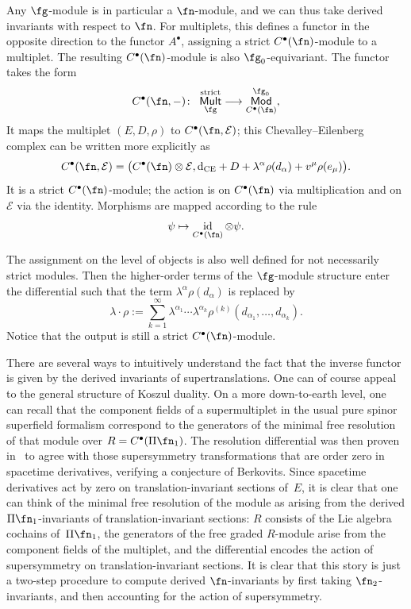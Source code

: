 \documentclass[10pt,a4paper]{amsart}
\numberwithin{equation}{section}
\def\cE{\mathcal E}\def\cF{\mathcal F}\def\cG{\mathcal G}\def\cH{\mathcal H}
\def\cat#1{\ensuremath{\mathsf{#1}}}
\DeclareMathOperator{\Mod}{\cat{Mod}}
\DeclareMathOperator{\Mult}{\cat{Mult}}
\def\bu{\bullet}
\def\d{{\rm d}}
\DeclareMathOperator{\id}{id}
\begin{document}
Any $\fg$-module is in particular a $\fn$-module, and we can thus take derived invariants with respect to $\fn$. For multiplets, this defines a functor in the opposite direction to the functor $A^\bullet$, assigning a strict $C^\bullet(\fn)$-module to a multiplet. The resulting $C^\bullet(\fn)$-module is also $\fg_0$-equivariant.
The functor takes the form
\begin{equation*}
C^\bullet(\fn , -) \colon \ \Mult_{\fg}^{\mathrm{strict}} \longrightarrow \Mod^{\fg_0}_{C^\bullet(\fn)},
\end{equation*}
It maps the multiplet	$(E,D,\rho)$ to $C^\bullet(\fn , \cE)$; this Chevalley--Eilenberg complex can be written more explicitly as
\begin{equation*}
C^\bullet(\fn , \cE) = \big( C^\bullet(\fn) \otimes \cE , \d_{\mathrm{CE}} + D + \lambda^\alpha \rho(d_\alpha) + v^\mu \rho(e_\mu) \big) .
\end{equation*}
It is a strict $C^\bullet(\fn)$-module; the action is on $C^\bullet(\fn)$ via multiplication and on $\cE$ via the identity. Morphisms are mapped according to the rule
\begin{equation*}
\psi \mapsto
\id_{C^\bullet(\fn)} \otimes \psi .
\end{equation*}

\begin{rmk}
	The assignment on the level of objects is also well defined for not necessarily strict modules. Then the higher-order terms of the $\fg$-module structure enter the differential such that the term $\lambda^\alpha \rho(d_\alpha)$ is replaced by
	\begin{equation*}
	\lambda \cdot \rho := \sum_{k=1}^{\infty} \lambda^{\alpha_1} \cdots \lambda^{\alpha_k} \rho^{(k)}(d_{\alpha_1} , \dots , d_{\alpha_k}).
	\end{equation*}
	Notice that the output is still a strict $C^\bullet(\fn)$-module.
\end{rmk}
There are several ways to intuitively understand the fact that the inverse functor is given by the derived invariants of supertranslations. One can of course appeal to the general structure of Koszul duality. On a more down-to-earth level, one can recall that the component fields of a supermultiplet in the usual pure spinor superfield formalism correspond to the generators of the minimal free resolution of that module over $R = C^\bu(\Pi \fn_1)$. The resolution differential was then proven in~\cite{perspectives} to agree with those supersymmetry transformations that are order zero in spacetime derivatives, verifying a conjecture of Berkovits. Since spacetime derivatives act by zero on translation-invariant sections of~$E$, it is clear that one can think of the minimal free resolution of the module as arising from the derived $\Pi \fn_1$-invariants of translation-invariant sections: $R$ consists of the Lie algebra cochains of~$\Pi \fn_1$, the generators of the free graded $R$-module arise from the component fields of the multiplet, and the differential encodes the action of supersymmetry on translation-invariant sections. It is clear that this story is just a two-step procedure to compute derived $\fn$-invariants by first taking $\fn_2$-invariants, and then accounting for the action of supersymmetry.
\end{document}
